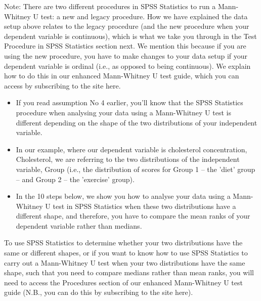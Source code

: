 \documentclass[]{article}
\begin{document}
\begin{framed}
Note: There are two different procedures in SPSS Statistics to run a Mann-Whitney U test: a new and legacy procedure. How we have explained the data setup above relates to the legacy procedure (and the new procedure when your dependent variable is continuous), which is what we take you through in the Test Procedure in SPSS Statistics section next. We mention this because if you are using the new procedure, you have to make changes to your data setup if your dependent variable is ordinal (i.e., as opposed to being continuous). We explain how to do this in our enhanced Mann-Whitney U test guide, which you can access by subscribing to the site here.
\end{framed}

\begin{itemize}
	\item If you read assumption No 4 earlier, you'll know that the SPSS Statistics procedure when analysing your data using a Mann-Whitney U test is different depending on the shape of the two distributions of your independent variable.
	\item  In our example, where our dependent variable is cholesterol concentration, Cholesterol, we are referring to the two distributions of the independent variable, Group (i.e., the distribution of scores for Group 1 – the 'diet' group – and Group 2 – the 'exercise' group). 
	\item In the 10 steps below, we show you how to analyse your data using a Mann-Whitney U test in SPSS Statistics when these two distributions have a different shape, and therefore, you have to compare the mean ranks of your dependent variable rather than medians.
\end{itemize}


To use SPSS Statistics to determine whether your two distributions have the same or different shapes, or if you want to know how to use SPSS Statistics to carry out a Mann-Whitney U test when your two distributions have the same shape, such that you need to compare medians rather than mean ranks, you will need to access the Procedures section of our enhanced Mann-Whitney U test guide (N.B., you can do this by subscribing to the site here). 
\end{document}
